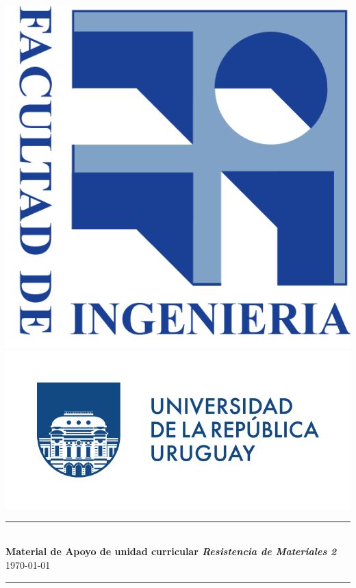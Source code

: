 \begin{titlepage}
	
	\begin{center}
		\includegraphics[height=0.14\textwidth]{figs/logofing}
		\hfill
		\includegraphics[height=0.17\textwidth]{figs/logoudelar}    

	\vspace{1cm}

        \rule{\linewidth}{0.2mm} \\[4mm]
		{\large\sffamily\bfseries Material de Apoyo de unidad curricular \textit{Resistencia de Materiales 2}} \\[5mm]
		{\sffamily \today } \\
		
		\rule{\linewidth}{0.2mm} \\[2mm]
	\end{center}
  
\end{titlepage}
